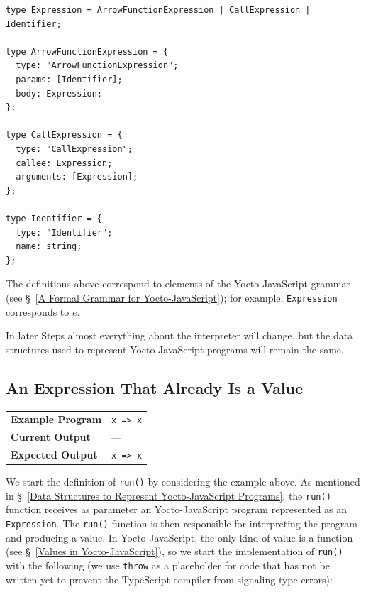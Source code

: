 \documentclass[12pt, oneside]{book}
\begin{document}
\begin{verbatim}
type Expression = ArrowFunctionExpression | CallExpression | Identifier;

type ArrowFunctionExpression = {
  type: "ArrowFunctionExpression";
  params: [Identifier];
  body: Expression;
};

type CallExpression = {
  type: "CallExpression";
  callee: Expression;
  arguments: [Expression];
};

type Identifier = {
  type: "Identifier";
  name: string;
};
\end{verbatim}

\begin{mdframed}[frametitle = {Advanced}]
The definitions above correspond to elements of the Yocto-JavaScript grammar (see §~\ref{A Formal Grammar for Yocto-JavaScript}); for example, \texttt{Expression} corresponds to $e$.
\end{mdframed}

In later Steps almost everything about the interpreter will change, but the data structures used to represent Yocto-JavaScript programs will remain the same.

\subsection{An Expression That Already Is a Value}
\label{An Expression That Already Is a Value}

\begin{center}
\begin{tabular}{ll}
\textbf{Example Program} & \texttt{x => x} \\
\textbf{Current Output} & — \\
\textbf{Expected Output} & \texttt{x => x} \\
\end{tabular}
\end{center}

We start the definition of \texttt{run()} by considering the example above. As mentioned in §~\ref{Data Structures to Represent Yocto-JavaScript Programs}, the \texttt{run()} function receives as parameter an Yocto-JavaScript program represented as an \texttt{Expression}. The \texttt{run()} function is then responsible for interpreting the program and producing a value. In Yocto-JavaScript, the only kind of value is a function (see §~\ref{Values in Yocto-JavaScript}), so we start the implementation of \texttt{run()} with the following (we use \texttt{throw} as a placeholder for code that has not be written yet to prevent the TypeScript compiler from signaling type errors):
\end{document}
